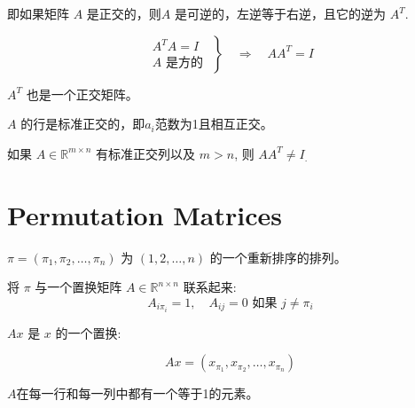 \begin{theorem}[正交矩阵满足非奇异性]
    
    即如果矩阵 $ A $ 是正交的，则$ A $ 是可逆的，左逆等于右逆，且它的逆为 $ A^{T} $.

    \begin{equation} \left.\begin{array}{l}A^{T} A=I \\ A \text { 是方的 }\end{array}\right\} \quad \Rightarrow \quad A A^{T}=I \end{equation}
\end{theorem}

\begin{corollary}
    $ A^{T} $ 也是一个正交矩阵。
\end{corollary}

\begin{corollary}
    $ A $ 的行是标准正交的，即$a_i$范数为1且相互正交。
\end{corollary}

\begin{remark}
    如果 $ A \in \mathbb{R}^{m \times n} $ 有标准正交列以及 $ m>n $, 则 $ A A^{T} \neq I_{\text {. }} $
\end{remark}

\section{Permutation Matrices}

\begin{notation}
    $ \pi=\left(\pi_{1}, \pi_{2}, \ldots, \pi_{n}\right) $ 为 $ (1,2, \ldots, n) $ 的一个重新排序的排列。

    将 $ \pi $ 与一个置换矩阵 $ A \in \mathbb{R}^{n \times n} $ 联系起来:
\begin{equation}
A_{i \pi_{i}}=1, \quad A_{i j}=0 \text { 如果 } j \neq \pi_{i}
\end{equation}
\end{notation}

\begin{definition}[置换]
    $ A x $ 是 $ x $ 的一个置换:
    
    \begin{equation} A x=\left(x_{\pi_{1}}, x_{\pi_{2}}, \ldots, x_{\pi_{n}}\right) \end{equation}
\end{definition}

$A$在每一行和每一列中都有一个等于1的元素。

